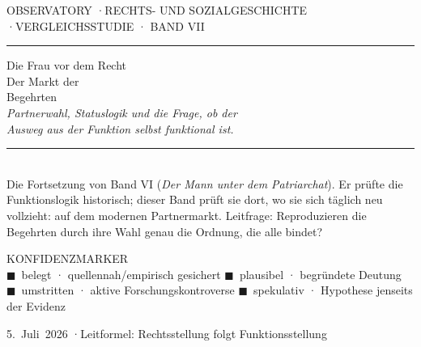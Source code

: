 \documentclass[11pt]{article}
\begin{document}
\begin{titlepage}
\thispagestyle{empty}
\colorbox{obsbg}{%
\begin{minipage}[t][\paperheight][t]{\paperwidth}
\color{obspaper}
\vspace{2.6cm}
\hspace{2.3cm}\begin{minipage}{0.82\textwidth}
{\ttfamily\footnotesize\color{obsaccent}OBSERVATORY \quad·\quad RECHTS- UND SOZIALGESCHICHTE \quad·\quad VERGLEICHSSTUDIE · BAND VII}\\[0.3em]
{\color{obsmuted}\rule{\linewidth}{0.4pt}}

\vspace{2.4cm}
{\grotesklight\fontsize{15}{18}\selectfont\color{obsline} Die Frau vor dem Recht}\\[0.7em]
{\groteskmed\fontsize{40}{46}\selectfont Der Markt der\\[0.15em] Begehrten}\\[1.1em]
{\grotesklight\fontsize{16}{22}\selectfont\color{obsline}\itshape
Partnerwahl, Statuslogik und die Frage, ob der\\ Ausweg aus der Funktion selbst funktional ist.}

\vspace{2.2cm}
{\color{obsmuted}\rule{\linewidth}{0.4pt}}\\[0.5em]
{\grotesklight\normalsize\color{obsline}
Die Fortsetzung von Band VI (\textit{Der Mann unter dem Patriarchat}).
Er prüfte die Funktionslogik historisch; dieser Band prüft sie dort, wo sie
sich täglich neu vollzieht: auf dem modernen Partnermarkt. Leitfrage:
Reproduzieren die Begehrten durch ihre Wahl genau die Ordnung, die alle bindet?}

\vspace{1.6cm}
{\ttfamily\scriptsize\color{obsline}
KONFIDENZMARKER\\[0.5em]
\textcolor{cbelegt}{$\blacksquare$}~belegt · quellennah/empirisch gesichert \qquad
\textcolor{cplausibel}{$\blacksquare$}~plausibel · begr\"undete Deutung\\[0.3em]
\textcolor{cumstritten}{$\blacksquare$}~umstritten · aktive Forschungskontroverse \qquad
\textcolor{cspekulativ}{$\blacksquare$}~spekulativ · Hypothese jenseits der Evidenz}

\vfill
{\ttfamily\footnotesize\color{obsmuted}5.~Juli~2026 \quad·\quad Leitformel: Rechtsstellung folgt Funktionsstellung}
\vspace{2cm}
\end{minipage}
\end{minipage}}
\restoregeometry
\end{titlepage}

\tableofcontents
\thispagestyle{empty}
\clearpage


\end{document}
